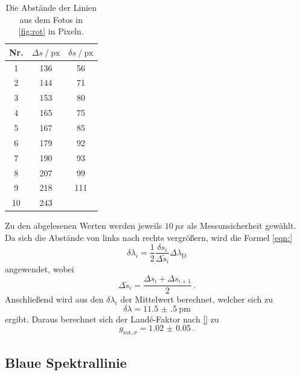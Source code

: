   \begin{table}
    \centering
    \caption{Die Abstände der Linien aus dem Fotos in \autoref{fig:rot} in Pixeln.}
    \label{tab:rotsigmas}
    \begin{tabular}{c S[table-format=3.0] S[table-format=3.0]}
      \toprule
      {Nr.} & {$\Delta s \mathbin{/} \text{px}$} & {$\delta s \mathbin{/} \text{px}$} \\
        &  136   &   56\\
       2  &  144   &   71\\
       3  &  153   &   80\\
       4  &  165   &   75\\
       5  &  167   &   85\\
       6  &  179   &   92\\
       7  &  190   &   93\\
       8  &  207   &   99\\
       9  &  218   &   111\\
      10  &  243     \\
      \bottomrule
    \end{tabular}
  \end{table}

  \noindent Zu den abgelesenen Werten werden jeweils $\SI{10}{px}$ als Messunsicherheit gewählt. Da sich die Abstände von links nach rechts vergrößern,
  wird die Formel \eqref{eqn:}
  \begin{equation*}
    \delta \lambda_i = \frac{1}{2} \frac{\delta s_i}{\Delta \tilde{s}_i} \Delta \lambda_\text{D}
  \end{equation*}
  angewendet, wobei 
  \begin{equation*}
    \Delta \tilde{s}_i = \frac{\Delta s_i + \Delta s_{i+1}}{2}\, .
  \end{equation*} 
  Anschließend wird aus den $\delta \lambda_i$ der Mittelwert berechnet, welcher sich zu 
  \begin{equation*}
    \delta \lambda = \SI{11.5(5)}{\pico\metre}
  \end{equation*}
  ergibt. 
  Daraus berechnet sich der Land\'{e}-Faktor nach \eqref{} zu 
  \begin{equation*}
    g_{\text{rot}, \sigma} = \num{1.02(5)}\, .
  \end{equation*}

 
\subsection{Blaue Spektrallinie}

